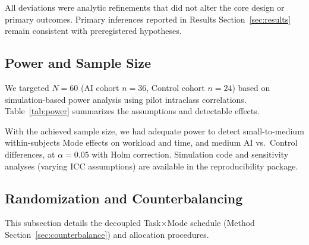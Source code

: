 \documentclass[sigconf]{acmart}
\begin{document}
All deviations were analytic refinements that did not alter the core design or primary outcomes. Primary inferences reported in Results Section~\ref{sec:results} remain consistent with preregistered hypotheses.

\subsection{Power and Sample Size}

We targeted \(N{=}60\) (AI cohort \(n{=}36\), Control cohort \(n{=}24\)) based on simulation-based power analysis using pilot intraclass correlations. Table~\ref{tab:power} summarizes the assumptions and detectable effects.

\begin{table}[h!]
  \centering
  \caption{Power assumptions and detectable effects (simulated). Simulations used 1{,}000 draws with pilot ICC estimates from a 6-participant pilot study.}
  \label{tab:power}
  \small
\end{table}

With the achieved sample size, we had adequate power to detect small-to-medium within-subjects Mode effects on workload and time, and medium AI vs.\ Control differences, at \(\alpha{=}0.05\) with Holm correction. Simulation code and sensitivity analyses (varying ICC assumptions) are available in the reproducibility package.

\subsection{Randomization and Counterbalancing}
\label{app:randomization}

This subsection details the decoupled Task\(\times\)Mode schedule (Method Section~\ref{sec:counterbalance}) and allocation procedures.
\end{document}
